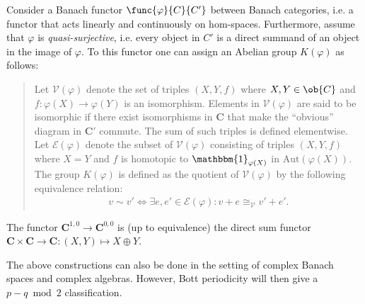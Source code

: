     \begin{construct}\label{clifford:functor_k_group}
        Consider a Banach functor $\func{\varphi}{C}{C'}$ between Banach categories, i.e. a functor that acts linearly and continuously on hom-spaces. Furthermore, assume that $\varphi$ is \textit{quasi-surjective}, i.e. every object in $C'$ is a direct summand of an object in the image of $\varphi$. To this functor one can assign an Abelian group $K(\varphi)$ as follows:
        \begin{quote}
            Let $\mathscr{V}(\varphi)$ denote the set of triples $(X,Y,f)$ where $X,Y\in\ob{C}$ and $f:\varphi(X)\rightarrow\varphi(Y)$ is an isomorphism. Elements in $\mathscr{V}(\varphi)$ are said to be isomorphic if there exist isomorphisms in $\mathbf{C}$ that make the ``obvious'' diagram in $\mathbf{C'}$ commute. The sum of such triples is defined elementwise. Let $\mathscr{E}(\varphi)$ denote the subset of $\mathscr{V}(\varphi)$ consisting of triples $(X,Y,f)$ where $X=Y$ and $f$ is homotopic to $\mathbbm{1}_{\varphi(X)}$ in $\text{Aut}(\varphi(X))$. The group $K(\varphi)$ is defined as the quotient of $\mathscr{V}(\varphi)$ by the following equivalence relation:
            \begin{gather}
                v\sim v'\iff\exists e,e'\in\mathscr{E}(\varphi):v+e\cong_{\mathscr{V}} v'+e'.
            \end{gather}
        \end{quote}
    \end{construct}

    \begin{example}[$K^{0,0}(\mathbf{C})$]\label{clifford:k00}
        The functor $\mathbf{C}^{1,0}\rightarrow\mathbf{C}^{0,0}$ is (up to equivalence) the direct sum functor $\mathbf{C}\times\mathbf{C}\rightarrow\mathbf{C}:(X,Y)\mapsto X\oplus Y$.
    \end{example}

    \begin{remark}\label{clifford:complex_bott_periodicity}
        The above constructions can also be done in the setting of complex Banach spaces and complex algebras. However, Bott periodicity will then give a $p-q\bmod2$ classification.
    \end{remark}

